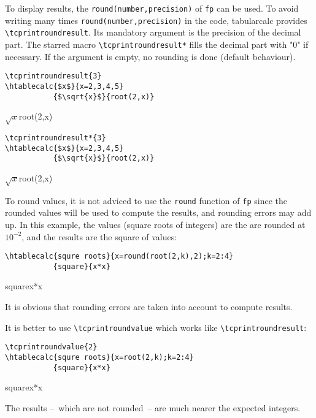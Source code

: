 \documentclass[a4paper,10pt]{article}
\newcommand\tbcalc{\textsf{tabularcalc}\xspace}
\newcommand\verbinline{\lstinline[breaklines=false,basicstyle=\normalsize\ttfamily]}
\begin{document}
To display results, the \verb|round(number,precision)| of \verb=fp= can be used. To avoid writing many times \verb|round(number,precision)| in the code, \tbcalc provides \verbinline|\tcprintroundresult|. Its mandatory argument is the precision of the decimal part. The starred macro \verbinline|\tcprintroundresult*| fills the decimal part with "0" if necessary. If the argument is empty, no rounding is done (default behaviour).
\begin{center}
\begin{minipage}{0.5\linewidth}
\begin{center}
\begin{lstlisting}
\tcprintroundresult{3}
\htablecalc{$x$}{x=2,3,4,5}
           {$\sqrt{x}$}{root(2,x)}
\end{lstlisting}
           {$\sqrt{x}$}{root(2,x)}
\end{center}
\end{minipage}%
\begin{minipage}{0.5\linewidth}
\begin{center}
\begin{lstlisting}
\tcprintroundresult*{3}
\htablecalc{$x$}{x=2,3,4,5}
           {$\sqrt{x}$}{root(2,x)}
\end{lstlisting}
           {$\sqrt{x}$}{root(2,x)}
\end{center}
\end{minipage}
\end{center}
To round values, it is not adviced to use the \verb|round| function of \verb=fp= since the rounded values will be used to compute the results, and rounding errors may add up. In this example, the values (square roots of integers) are the are rounded at $10^{-2}$, and the results are the square of values:
\begin{center}
\begin{minipage}{0.75\linewidth}
\begin{lstlisting}
\htablecalc{squre roots}{x=round(root(2,k),2);k=2:4}
           {square}{x*x}
\end{lstlisting}
\end{minipage}

           {square}{x*x}
\end{center}
It is obvious that rounding errors are taken into account to compute results.

It is better to use \verbinline|\tcprintroundvalue| which works like \verbinline|\tcprintroundresult|:
\begin{center}
\begin{lstlisting}
\tcprintroundvalue{2}
\htablecalc{squre roots}{x=root(2,k);k=2:4}
           {square}{x*x}
\end{lstlisting}
           {square}{x*x}
\end{center}
The results --~which are not rounded~-- are much nearer the expected integers.
\end{document}
